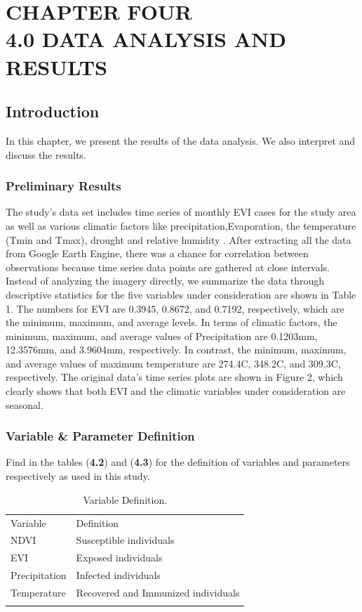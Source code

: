 
\chapter{CHAPTER FOUR\\4.0 DATA ANALYSIS AND RESULTS} %
\section{Introduction}
In this chapter, we present the results of the data analysis. We also interpret and discuss the results. 

\subsection{Preliminary Results}
The study's data set includes time series of monthly EVI cases for the study area as well as various climatic factors like precipitation,Evaporation, the temperature (Tmin and Tmax), drought and relative humidity . After extracting all the data from  Google Earth Engine, there was a chance for correlation between observations because time series data points are gathered at close intervals. Instead of analyzing the imagery directly, we  summarize the data through descriptive statistics for the five variables under consideration are shown in Table 1. The numbers for EVI are 0.3945, 0.8672, and 0.7192, respectively, which are the minimum, maximum, and average levels. In terms of climatic factors, the minimum, maximum, and average values of Precipitation are 0.1203mm, 12.3576mm, and 3.9604mm, respectively. In contrast, the minimum, maximum, and average values of maximum temperature are 274.4C, 348.2C, and 309.3C, respectively. The original data's time series plots are shown in Figure 2, which clearly shows that both EVI and the climatic variables under consideration are seasonal. 
\subsection{Variable \& Parameter Definition}
Find in the tables (\textbf{4.2}) and (\textbf{4.3}) for the definition of variables and parameters respectively as used in this study. 
\begin{table}
	\label{Variable}
	\caption{Variable Definition.}
	\centering
	\begin{tabularx}{\textwidth}{ll}
		\hline\noalign{\smallskip}
		Variable & Definition \\ 
		\noalign{\smallskip}\hline\noalign{\smallskip}
		NDVI & Susceptible individuals \\  
		EVI & Exposed individuals \\ 
		Precipitation & Infected individuals \\ 
		Temperature & Recovered and Immunized individuals \\ 
		\hline\noalign{\smallskip}
	\end{tabularx}
\end{table}

